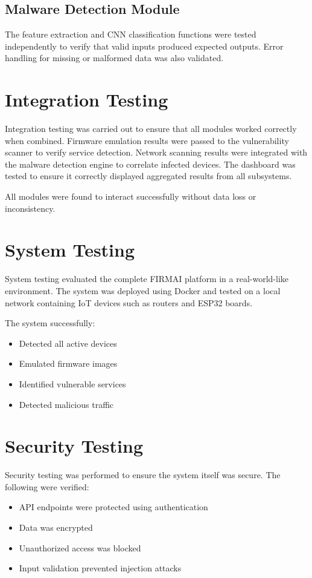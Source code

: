 \subsection{Malware Detection Module}
The feature extraction and CNN classification functions were tested independently to verify that valid inputs produced expected outputs. Error handling for missing or malformed data was also validated.

\section{Integration Testing}
Integration testing was carried out to ensure that all modules worked correctly when combined. Firmware emulation results were passed to the vulnerability scanner to verify service detection. Network scanning results were integrated with the malware detection engine to correlate infected devices. The dashboard was tested to ensure it correctly displayed aggregated results from all subsystems.

All modules were found to interact successfully without data loss or inconsistency.

\section{System Testing}
System testing evaluated the complete FIRMAI platform in a real-world-like environment. The system was deployed using Docker and tested on a local network containing IoT devices such as routers and ESP32 boards.

The system successfully:
\begin{itemize}
	\item Detected all active devices
	\item Emulated firmware images
	\item Identified vulnerable services
	\item Detected malicious traffic
\end{itemize}

\section{Security Testing}
Security testing was performed to ensure the system itself was secure. The following were verified:
\begin{itemize}
	\item API endpoints were protected using authentication
	\item Data was encrypted
	\item Unauthorized access was blocked
	\item Input validation prevented injection attacks
\end{itemize}
